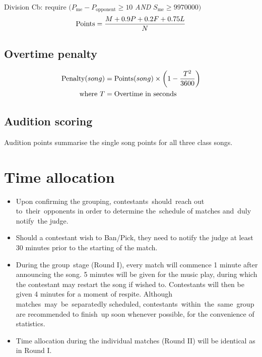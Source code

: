 \documentclass{article}
\newcommand{\alert}[1]{{\color{red} #1}}
\newcommand{\penalyformula}[1]{{\color{cyan} #1}}
\begin{document}
Division Cb: require $(P_\text{me} - P_\text{opponent} \geq 10$ \emph{AND} $S_\text{me} \geq \num[group-separator={,}]{9970000})$
\alert{
	\begin{equation*}
		\text{Points}		= \frac{M + 0.9P + 0.2F + 0.75L} N
	\end{equation*}
}

\subsection{Overtime penalty}
\penalyformula{
	\begin{align*}
		\text{Penalty}(song) & = \text{Points}(song) \times \left(1-\frac{{T}^2} {3600}\right) \\
		\text{where}~T       & =\text{Overtime in seconds}
	\end{align*}
}

\subsection{Audition scoring}

Audition points summarise the single song points
for all three class songs.

\section{Time allocation}

\begin{itemize}

	\item Upon confirming the grouping,
	      contestants should reach out to their opponents
	      in order to determine the schedule of matches
	      and duly notify the judge.

	\item Should a contestant wish to Ban/Pick,
	      they need to notify the judge at least 30 minutes
	      prior to the starting of the match.

	\item During the group stage (Round I),
	      every match will commence 1 minute
	      after announcing the song.
	      5 minutes will be given for the music play,
	      during which the contestant may restart the song if wished to.
	      Contestants will then be given 4 minutes for
	      a moment of respite.
	      Although matches may be separatedly scheduled,  %
	      contestants within the same group are recommended
	      to finish up soon whenever possible,
	      for the convenience of statistics.  %

	\item Time allocation during the individual matches (Round II) will be identical as in Round I.
\end{itemize}
\end{document}
